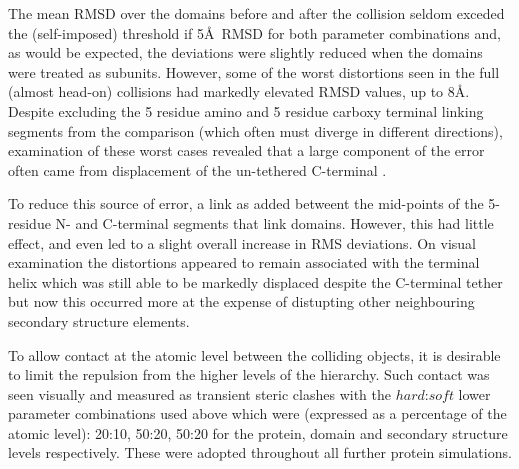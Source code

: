 The mean RMSD over the domains before and after the collision seldom exceded the (self-imposed)
threshold if 5\AA\ RMSD for both parameter combinations and, as would be expected, the deviations
were slightly reduced when the domains were treated as subunits.   However, some of the worst
distortions seen in the full (almost head-on) collisions had markedly elevated RMSD values, up to 8\AA.
Despite excluding the 5 residue amino and 5 residue carboxy terminal linking segments from the comparison
(which often must diverge in different directions), examination of these worst cases revealed that a
large component of the error often came from displacement of the un-tethered C-terminal \AH.

To reduce this source of error, a link as added betweent the mid-points of the 5-residue N- and C-terminal
segments that link domains.  However, this had little effect, and even led to a slight overall increase in RMS
deviations.   On visual examination the distortions appeared to remain associated with the terminal helix
which was still able to be markedly displaced despite the C-terminal tether but now this occurred more
at the expense of distupting other neighbouring secondary structure elements.

To allow contact at the atomic level between the colliding objects,
it is desirable to limit the repulsion from the higher levels of the hierarchy.
Such contact was seen visually and measured as transient steric clashes with the $hard$:$soft$
lower parameter combinations used above which were (expressed as a percentage of the atomic level): 
20:10, 50:20, 50:20 for the protein, domain and secondary structure levels respectively.
These were adopted throughout all further protein simulations.

